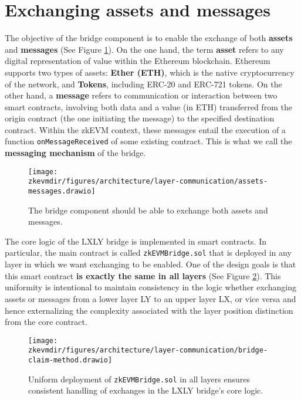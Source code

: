 \section{Exchanging assets and messages}
The objective of the bridge component is to enable the exchange of both \textbf{assets} and \textbf{messages} (See Figure \ref{fig:assets-messages}). On the one hand, the term \textbf{asset} refers to any digital representation of value within the Ethereum blockchain. Ethereum supports two types of assets: \textbf{Ether (ETH)}, which is the native cryptocurrency of the network, and \textbf{Tokens}, including ERC-20 and ERC-721 tokens. On the other hand, a \textbf{message} refers to communication or interaction between two smart contracts, involving both data and a value (in ETH) transferred from the origin contract (the one initiating the message) to the specified destination contract. Within the zkEVM context, these messages entail the execution of a function \texttt{onMessageReceived} of some existing contract. This is what we call the \textbf{messaging mechanism} of the bridge.

\begin{figure}[H]
\centering
\texttt{[image: \\zkevmdir/figures/architecture/layer-communication/assets-messages.drawio]}
\caption{The bridge component should be able to exchange both assets and messages.}
\label{fig:assets-messages}
\end{figure}

The core logic of the LXLY bridge is implemented in smart contracts. In particular, the main contract is called \texttt{zkEVMBridge.sol} that is deployed in any layer in which we want exchanging to be enabled. One of the design goals is that this smart contract \textbf{is exactly the same in all layers} (See Figure \ref{fig:bridge-claim-method}). This uniformity is intentional to maintain consistency in the logic whether exchanging assets or messages from a lower layer LY to an upper layer LX, or vice versa and hence externalizing the complexity associated with the layer position distinction from the core contract.

\begin{figure}[H]
\centering
\texttt{[image: \\zkevmdir/figures/architecture/layer-communication/bridge-claim-method.drawio]}
\caption{Uniform deployment of \texttt{zkEVMBridge.sol} in all layers ensures consistent handling of exchanges in the LXLY bridge's core logic.}
\label{fig:bridge-claim-method}
\end{figure}

